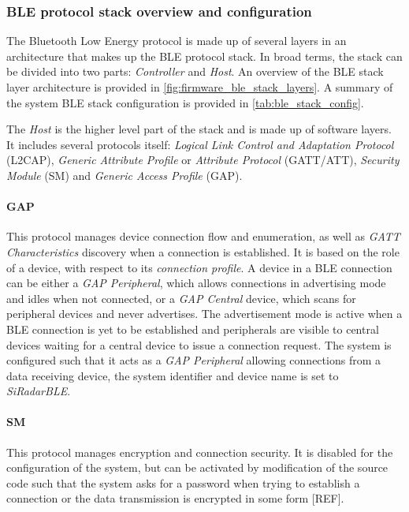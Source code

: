\subsubsection{BLE protocol stack overview and configuration} \label{sec:ble_stack}

The Bluetooth Low Energy protocol is made up of several layers in an architecture that makes up the BLE protocol stack. In broad terms, the stack can be divided into two parts: \textit{Controller} and \textit{Host}. An overview of the BLE stack layer architecture is provided in \cref{fig:firmware_ble_stack_layers}. A summary of the system BLE stack configuration is provided in \cref{tab:ble_stack_config}.

The \textit{Host} is the higher level part of the stack and is made up of software layers. It includes several protocols itself: \textit{Logical Link Control and Adaptation Protocol} (L2CAP), \textit{Generic Attribute Profile} or \textit{Attribute Protocol} (GATT/ATT), \textit{Security Module} (SM) and \textit{Generic Access Profile} (GAP).

\paragraph{GAP}
This protocol manages device connection flow and enumeration, as well as \textit{GATT Characteristics} discovery when a connection is established. It is based on the role of a device, with respect to its \textit{connection profile}. A device in a BLE connection can be either a \textit{GAP Peripheral}, which allows connections in advertising mode and idles when not connected, or a \textit{GAP Central} device, which scans for peripheral devices and never advertises. The advertisement mode is active when a BLE connection is yet to be established and peripherals are visible to central devices waiting for a central device to issue a connection request. The system is configured such that it acts as a \textit{GAP Peripheral} allowing connections from a data receiving device, the system identifier and device name is set to \textit{SiRadarBLE}.

\paragraph{SM}
This protocol manages encryption and connection security. It is disabled for the configuration of the system, but can be activated by modification of the source code such that the system asks for a password when trying to establish a connection or the data transmission is encrypted in some form [REF].

